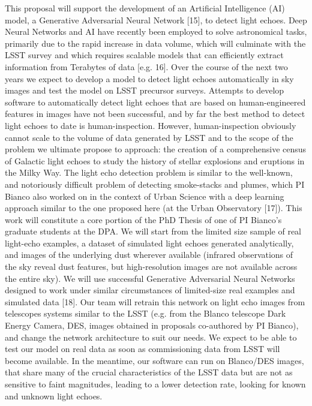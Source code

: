 \documentclass{proposalnsf}
\begin{document}
This proposal will support the development of an Artificial Intelligence (AI) model, a Generative Adversarial Neural Network [15], to detect light echoes.  Deep Neural Networks and AI have recently been employed to solve astronomical tasks, primarily due to the rapid increase in data volume, which will culminate with the LSST survey and which requires scalable models that can efficiently extract information from Terabytes of data [e.g. 16].  Over the course of the next two years we expect to develop a model to detect light echoes automatically in sky images and test the model on LSST precursor surveys.  Attempts to develop software to automatically detect light echoes that are based on human-engineered features in images have not been successful, and by far the best method to detect light echoes to date is human-inspection. However, human-inspection obviously cannot scale to the volume of data generated by LSST and to the scope of the problem we ultimate propose to approach: the creation of a comprehensive census of Galactic light echoes to study the history of stellar explosions and eruptions in the Milky Way.  
The light echo detection problem is similar to the well-known, and notoriously difficult problem of detecting smoke-stacks and plumes, which PI Bianco also worked on in the context of Urban Science with a deep learning approach similar to the one proposed here (at the Urban Observatory [17]).  This work will constitute a core portion of the PhD Thesis of one of PI Bianco’s graduate students at the DPA.  We will start from the limited size sample of real light-echo examples, a dataset of simulated light echoes generated analytically, and images of the underlying dust wherever available (infrared observations of the sky reveal dust features, but high-resolution images are not available across the entire sky).  We will use successful Generative Adversarial Neural Networks designed to work under similar circumstances of limited-size real examples and simulated data [18].  Our team will retrain this network on light echo images from telescopes systems similar to the LSST (e.g. from the Blanco telescope Dark Energy Camera, DES, images obtained in proposals co-authored by PI Bianco), and change the network architecture to suit our needs. We expect to be able to test our model on real data as soon as commissioning data from LSST will become available.  In the meantime, our software can run on Blanco/DES images, that share many of the crucial characteristics of the LSST data but are not as sensitive to faint magnitudes, leading to a lower detection rate, looking for known and unknown light echoes.
\end{document}
